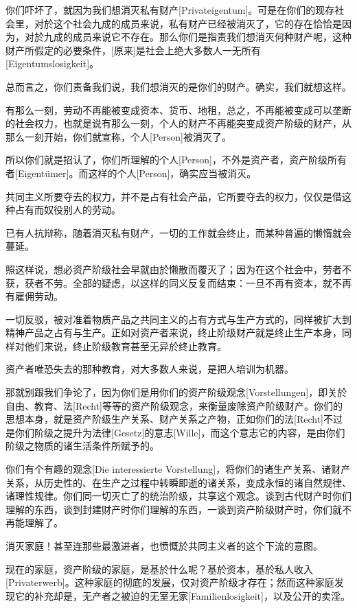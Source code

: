 \documentclass[a4paper,12pt]{ctexart}
\begin{document}
你们吓坏了，就因为我们想消灭私有财产[Privateigentum]。可是在你们的现存社会里，对於这个社会九成的成员来说，私有财产已经被消灭了，它的存在恰恰是因为，对於九成的成员来说它不存在。那么你们是指责我们想消灭何种财产呢，这种财产所假定的必要条件，[原来]是社会上绝大多数人一无所有[Eigentumslosigkeit]。

总而言之，你们责备我们说，我们想消灭的是你们的财产。确实，我们就想这样。

有那么一刻，劳动不再能被变成资本、货币、地租，总之，不再能被变成可以垄断的社会权力，也就是说有那么一刻，个人的财产不再能突变成资产阶级的财产，从那么一刻开始，你们就宣称，个人[Person]被消灭了。

所以你们就是招认了，你们所理解的个人[Person]，不外是资产者，资产阶级所有者[Eigentümer]。而这样的个人[Person]，确实应当被消灭。

共同主义所要夺去的权力，并不是占有社会产品，它所要夺去的权力，仅仅是借这种占有而奴役别人的劳动。


已有人抗辩称，随着消灭私有财产，一切的工作就会终止，而某种普遍的懒惰就会蔓延。

照这样说，想必资产阶级社会早就由於懒散而覆灭了；因为在这个社会中，劳者不获，获者不劳。全部的疑虑，以这样的同义反复而结束：一旦不再有资本，就不再有雇佣劳动。

一切反驳，被对准着物质产品之共同主义的占有方式与生产方式的，同样被扩大到精神产品之占有与生产。正如对资产者来说，终止阶级财产就是终止生产本身，同样对他们来说，终止阶级教育甚至无异於终止教育。

资产者唯恐失去的那种教育，对大多数人来说，是把人培训为机器。

那就别跟我们争论了，因为你们是用你们的资产阶级观念[Vorstellungen]，即关於自由、教育、法[Recht]等等的资产阶级观念，来衡量废除资产阶级财产。你们的思想本身，就是资产阶级生产关系、财产关系之产物，正如你们的法[Recht]不过是你们阶级之提升为法律[Gesetz]的意志[Wille]，而这个意志它的内容，是由你们阶级之物质的诸生活条件所赋予的。

你们有个有趣的观念[Die interessierte Vorstellung]，将你们的诸生产关系、诸财产关系，从历史性的、在生产之过程中转瞬即逝的诸关系，变成永恒的诸自然规律、诸理性规律。你们同一切灭亡了的统治阶级，共享这个观念。谈到古代财产时你们理解的东西，谈到封建财产时你们理解的东西，一谈到资产阶级财产时，你们就不再能理解了。


消灭家庭！甚至连那些最激进者，也愤慨於共同主义者的这个下流的意图。

现在的家庭，资产阶级的家庭，是基於什么呢？基於资本，基於私人收入[Privaterwerb]。这种家庭的彻底的发展，仅对资产阶级才存在；然而这种家庭发现它的补充却是，无产者之被迫的无室无家[Familienlosigkeit]，以及公开的卖淫。
\end{document}
